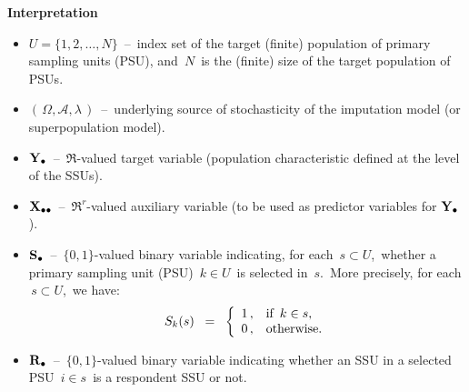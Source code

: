 \vskip 0.2cm
\noindent
\textbf{Interpretation}
\begin{itemize}
\item
    $U = \{1,2,\ldots,N\}$
    \,--\,
    index set of the target (finite) population of primary sampling units (PSU),
    and \,$N$\, is the (finite) size of the target population of PSUs.
\item
    $\left(\,\Omega,\mathscr{A},\lambda\,\right)$
    \,--\,
    underlying source of stochasticity of the imputation model (or superpopulation model).
\item
    $\mathbf{Y}_{\bullet}$
    \,--\,
    $\Re$-valued target variable (population characteristic defined at the level of the SSUs).
\item
    $\mathbf{X}_{\bullet\bullet}$
    \,--\,
    $\Re^{r}$-valued auxiliary variable (to be used as predictor variables for $\mathbf{Y}_{\bullet}$). 
\item
    $\mathbf{S}_{\bullet}$
    \,--\,
    $\{0,1\}$-valued binary variable indicating, for each \,$s \subset U$,\,
    whether a primary sampling unit (PSU) \,$k \in U$\, is selected in \,$s$.\,
    More precisely, for each \,$s \subset U$,\, we have:
    \begin{equation*}
    S_{k}(s)
    \;\; = \;\;
        \left\{\begin{array}{cl}
            1\,, & \textnormal{if \,$k \in s$},
            \\
            0\,, & \textnormal{otherwise}.
            \end{array}\right.
    \end{equation*}
\item
    $\mathbf{R}_{\bullet}$
    \,--\,
    $\{0,1\}$-valued binary variable indicating
    whether an SSU in a selected PSU \,$i \in s$\,
    is a respondent SSU or not.
\end{itemize}

